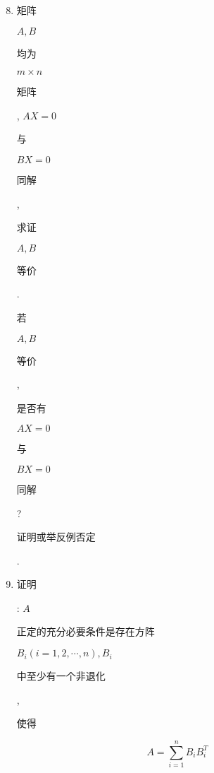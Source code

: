 \documentclass[10pt]{article}
\begin{document}
\begin{enumerate}
  \setcounter{enumi}{7}
  \item \begin{CJK}{UTF8}{mj}矩阵\end{CJK} $A, B$ \begin{CJK}{UTF8}{mj}均为\end{CJK} $m \times n$ \begin{CJK}{UTF8}{mj}矩阵\end{CJK}, $A X=0$ \begin{CJK}{UTF8}{mj}与\end{CJK} $B X=0$ \begin{CJK}{UTF8}{mj}同解\end{CJK}, \begin{CJK}{UTF8}{mj}求证\end{CJK} $A, B$ \begin{CJK}{UTF8}{mj}等价\end{CJK}. \begin{CJK}{UTF8}{mj}若\end{CJK} $A, B$ \begin{CJK}{UTF8}{mj}等价\end{CJK}, \begin{CJK}{UTF8}{mj}是否有\end{CJK} $A X=0$ \begin{CJK}{UTF8}{mj}与\end{CJK} $B X=0$ \begin{CJK}{UTF8}{mj}同解\end{CJK}? \begin{CJK}{UTF8}{mj}证明或举反例否定\end{CJK}.

  \item \begin{CJK}{UTF8}{mj}证明\end{CJK}: $A$ \begin{CJK}{UTF8}{mj}正定的充分必要条件是存在方阵\end{CJK} $B_{i}(i=1,2, \cdots, n), B_{i}$ \begin{CJK}{UTF8}{mj}中至少有一个非退化\end{CJK}, \begin{CJK}{UTF8}{mj}使得\end{CJK}

\end{enumerate}
$$
A=\sum_{i=1}^{n} B_{i} B_{i}^{T}
$$
\end{document}
